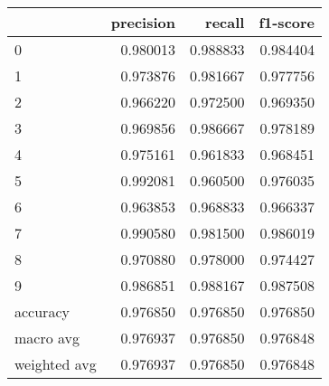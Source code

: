 \begin{tabular}{lrrr}
\toprule
 & precision & recall & f1-score \\
\midrule
0 & 0.980013 & 0.988833 & 0.984404 \\
1 & 0.973876 & 0.981667 & 0.977756 \\
2 & 0.966220 & 0.972500 & 0.969350 \\
3 & 0.969856 & 0.986667 & 0.978189 \\
4 & 0.975161 & 0.961833 & 0.968451 \\
5 & 0.992081 & 0.960500 & 0.976035 \\
6 & 0.963853 & 0.968833 & 0.966337 \\
7 & 0.990580 & 0.981500 & 0.986019 \\
8 & 0.970880 & 0.978000 & 0.974427 \\
9 & 0.986851 & 0.988167 & 0.987508 \\
accuracy & 0.976850 & 0.976850 & 0.976850 \\
macro avg & 0.976937 & 0.976850 & 0.976848 \\
weighted avg & 0.976937 & 0.976850 & 0.976848 \\
\bottomrule
\end{tabular}
